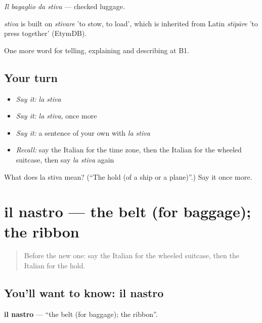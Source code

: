 \emph{Il bagaglio da stiva} — checked luggage.

\begin{cousinweb}
\emph{stiva} is built on \emph{stivare} 'to stow, to load', which is inherited from Latin \emph{stīpāre} 'to press together' (EtymDB).
\end{cousinweb}

\begin{grammarlens}[title={What you've built}]
One more word for telling, explaining and describing at B1.
\end{grammarlens}

\subsection*{Your turn}
\begin{itemize}
\raggedright
  \item \emph{Say it:} \emph{la stiva}
  \item \emph{Say it:} \emph{la stiva}, once more
  \item \emph{Say it:} a sentence of your own with \emph{la stiva}
  \item \emph{Recall:} say the Italian for the time zone, then the Italian for the wheeled suitcase, then say \emph{la stiva} again
\end{itemize}

\begin{tcolorbox}[breakable,colback=teal!4,colframe=teal!35!black,title={Before you move on}]
What does la stiva mean? (\textquotedblleft{}The hold (of a ship or a plane)\textquotedblright{}.) Say it once more.
\end{tcolorbox}
\section[il nastro]{il nastro — the belt (for baggage); the ribbon}

\label{lesson:IT-C426-nastro}



\begin{quote}
Before the new one: say the Italian for the wheeled suitcase, then the Italian for the hold.
\end{quote}

\subsection*{You'll want to know: il nastro}
\textbf{il nastro} — \textquotedblleft{}the belt (for baggage); the ribbon\textquotedblright{}.

